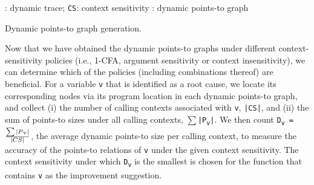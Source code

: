 \begin{algorithm}[th!]
\begin{algorithmic}[1]
{
\renewcommand{\algorithmicrequire}{\textbf{Input:}}
\renewcommand{\algorithmicensure}{\textbf{Output:}}
: dynamic trace; {\tt CS}: context sensitivity
: dynamic points-to graph
 \ENDCASE
{}
 \ENDCASE
\ENDIF
{}
 \ENDCASE
\ENDSWITCH
\ENDWHILE
}
\end{algorithmic}
\caption{Dynamic points-to graph generation.}
\label{alg:dyn-pts}
\end{algorithm}

Now that we have obtained the dynamic points-to graphs under different context-sensitivity policies (i.e., 1-CFA, argument sensitivity or context insensitivity), we can determine which of the policies (including combinations thereof) are beneficial. For a variable {\tt v} that is identified as a root cause, we locate its corresponding nodes via its program location in each dynamic points-to graph, and collect (i) the number of calling contexts associated with {\tt v}, {\tt |CS|}, and (ii) the sum of points-to sizes under all calling contexts, {\tt $\sum$|P\textsubscript{v}|}. We then count {\tt D\textsubscript{v} = $\sum|P\textsubscript{v}|\over |CS|$}, the average dynamic points-to size per calling context, to measure the accuracy of the points-to relations of {\tt v} under the given context sensitivity. The context sensitivity under which {\tt D\textsubscript{v}} is the smallest is chosen for the function that contains {\tt v} as the improvement suggestion.

